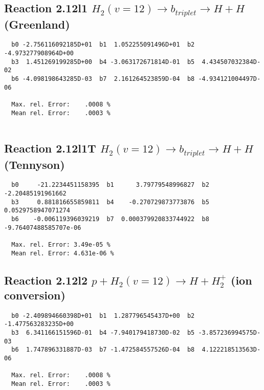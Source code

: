 \documentclass[12pt]{article}
\begin{document}
\newpage
\subsection{
Reaction 2.12l1
$ H_2(v=12) \rightarrow b_{triplet}\rightarrow H + H $ (Greenland) 
}


\begin{small}\begin{verbatim}
  b0 -2.756116092185D+01  b1  1.052255091496D+01  b2 -4.973277908964D+00
  b3  1.451269199285D+00  b4 -3.063172671814D-01  b5  4.434507032384D-02
  b6 -4.098198643285D-03  b7  2.161264523859D-04  b8 -4.934121004497D-06

  Max. rel. Error:    .0008 %
  Mean rel. Error:    .0003 %


\end{verbatim}\end{small}


\subsection{
Reaction 2.12l1T
$  H_2(v=12) \rightarrow b_{triplet}\rightarrow H + H $ (Tennyson)
}


\begin{small}\begin{verbatim}
  b0     -21.2234451158395  b1      3.79779548996827  b2     -2.20485191961662
  b3     0.881816655859811  b4    -0.270729873773876  b5    0.0529758947071274
  b6    -0.006119396039219  b7  0.000379920833744922  b8 -9.76407488585707e-06

  Max. rel. Error: 3.49e-05 %
  Mean rel. Error: 4.631e-06 %
\end{verbatim}\end{small}

\subsection{
Reaction 2.12l2
$ p + H_2(v=12) \rightarrow H + H_2^+$ (ion conversion)
}


\begin{small}\begin{verbatim}
  b0 -2.409894660398D+01  b1  1.287796545437D+00  b2 -1.477563283235D+00
  b3  6.341166151596D-01  b4 -7.940179418730D-02  b5 -3.857236994575D-03
  b6  1.747896331887D-03  b7 -1.472584557526D-04  b8  4.122218513563D-06

  Max. rel. Error:    .0008 %
  Mean rel. Error:    .0003 %


\end{verbatim}\end{small}
\end{document}
